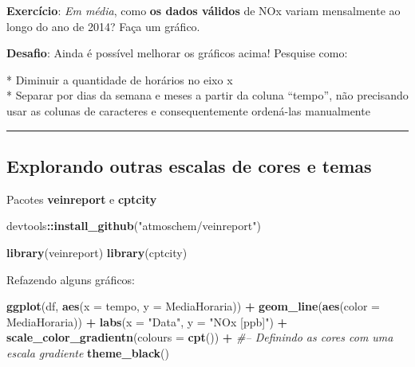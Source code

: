 \documentclass[]{book}
\newenvironment{Shaded}{\begin{snugshade}}{\end{snugshade}}
\newcommand{\KeywordTok}[1]{\textcolor[rgb]{0.13,0.29,0.53}{\textbf{#1}}}
\newcommand{\DataTypeTok}[1]{\textcolor[rgb]{0.13,0.29,0.53}{#1}}
\newcommand{\StringTok}[1]{\textcolor[rgb]{0.31,0.60,0.02}{#1}}
\newcommand{\CommentTok}[1]{\textcolor[rgb]{0.56,0.35,0.01}{\textit{#1}}}
\newcommand{\OperatorTok}[1]{\textcolor[rgb]{0.81,0.36,0.00}{\textbf{#1}}}
\newcommand{\NormalTok}[1]{#1}
\theoremstyle{definition}
\theoremstyle{definition}
\theoremstyle{definition}
\theoremstyle{remark}
\begin{document}
{\textbf{Exercício}: \emph{Em média}, como \textbf{os dados válidos} de
NOx variam mensalmente ao longo do ano de 2014? Faça um gráfico.}

{\textbf{Desafio}: Ainda é possível melhorar os gráficos acima! Pesquise
como:}

{* Diminuir a quantidade de horários no eixo x}\\
{* Separar por dias da semana e meses a partir da coluna ``tempo'', não
precisando usar as colunas de caracteres e consequentemente ordená-las
manualmente}

\begin{center}\rule{0.5\linewidth}{\linethickness}\end{center}

\subsection{Explorando outras escalas de cores e
temas}\label{explorando-outras-escalas-de-cores-e-temas}

Pacotes \textbf{veinreport} e \textbf{cptcity}

\begin{Shaded}
\begin{Highlighting}[]
\NormalTok{devtools}\OperatorTok{::}\KeywordTok{install_github}\NormalTok{(}\StringTok{"atmoschem/veinreport"}\NormalTok{)}
\end{Highlighting}
\end{Shaded}

\begin{Shaded}
\begin{Highlighting}[]
\KeywordTok{library}\NormalTok{(veinreport)}
\KeywordTok{library}\NormalTok{(cptcity)}
\end{Highlighting}
\end{Shaded}

Refazendo alguns gráficos:

\begin{Shaded}
\begin{Highlighting}[]
\KeywordTok{ggplot}\NormalTok{(df, }\KeywordTok{aes}\NormalTok{(}\DataTypeTok{x =}\NormalTok{ tempo, }\DataTypeTok{y =}\NormalTok{ MediaHoraria)) }\OperatorTok{+}\StringTok{ }
\StringTok{  }\KeywordTok{geom_line}\NormalTok{(}\KeywordTok{aes}\NormalTok{(}\DataTypeTok{color =}\NormalTok{ MediaHoraria)) }\OperatorTok{+}
\StringTok{  }\KeywordTok{labs}\NormalTok{(}\DataTypeTok{x =} \StringTok{"Data"}\NormalTok{, }\DataTypeTok{y =} \StringTok{"NOx [ppb]"}\NormalTok{) }\OperatorTok{+}
\StringTok{  }\KeywordTok{scale_color_gradientn}\NormalTok{(}\DataTypeTok{colours =} \KeywordTok{cpt}\NormalTok{()) }\OperatorTok{+}\StringTok{ }\CommentTok{#-- Definindo as cores com uma escala gradiente}
\StringTok{  }\KeywordTok{theme_black}\NormalTok{()}
\end{Highlighting}
\end{Shaded}
\end{document}
